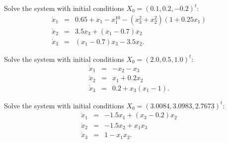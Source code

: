 \documentclass{ximera}
\begin{document}
\begin{exercise}  \label{c11.6.1g} 
Solve the system  with initial conditions 
$X_0 = (0.1,0.2, -0.2)^t$:
\begin{equation*} \label{e11.6.1g}
\begin{array}{rcl} 
\dot{x}_1 & = & 0.65 + x_1 - x_1^{10} - (x_3^2 + x_2^2)(1 + 0.25x_1)  \\
\dot{x}_2 & = & 3.5x_3 + (x_1 - 0.7)x_2  \\
\dot{x}_3 & = & (x_1 - 0.7)x_3 - 3.5x_2.
\end{array}
\end{equation*}
\end{exercise}

\begin{exercise}  \label{c11.6.1f}
Solve the system  with initial conditions 
$X_0 = (2.0, 0.5, 1.0)^t$:
\begin{equation*} \label{e11.6.1f}
\begin{array}{rcl} 
\dot{x}_1 & = & -x_2-x_3  \\
\dot{x}_2 & = &  x_1 + 0.2x_2 \\
\dot{x}_3 & = & 0.2 + x_3(x_1 - 1). \end{array}
\end{equation*}
\end{exercise}

\begin{exercise}  \label{c11.6.1h} 
Solve the system  with initial conditions 
$X_0 = (3.0084, 3.0983, 2.7673)^t$: 
\begin{equation*} \label{e11.6.1h}
\begin{array}{rcl} 
\dot{x}_1 & = &  -1.5x_1 + (x_3-0.2)x_2 \\
\dot{x}_2 & = &  -1.5x_2 + x_1x_3\\
\dot{x}_3 & = &  1 - x_1x_2.
\end{array}
\end{equation*}
\end{exercise}
\end{document}
